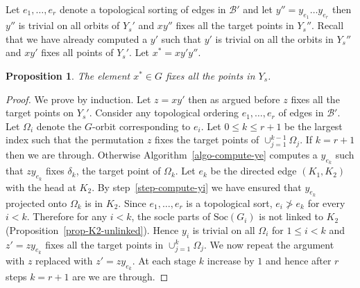 \documentclass[11pt]{madras}%
\newtheorem{proposition}[theorem]{Proposition}
\theoremstyle{remark}
\newcommand{\Soc}[1]{{\ensuremath{\mathrm{Soc}\left(#1\right)}}}
\begin{document}
Let $e_1,\ldots,e_r$ denote a topological sorting of edges in
$\mathcal{B}'$ and let $y'' = y_{e_1}\ldots y_{e_r}$ then $y''$ is
trivial on all orbits of $Y_s'$ and $xy''$ fixes all the target points
in $Y_s''$. Recall that we have already computed a $y'$ such that $y'$
is trivial on all the orbits in $Y_s''$ and $xy'$ fixes all points of
$Y_s'$. Let  $x^* = x y' y''$.

\begin{proposition}
  The element $x^* \in G$ fixes all the points in $Y_s$.
\end{proposition}
\begin{proof}
  We prove by induction. Let $z = xy'$ then as argued before $z$ fixes
  all the target points on $Y_s'$.  Consider any topological ordering
  $e_1,\ldots,e_r$ of edges in $\mathcal{B}'$. Let $\Omega_i$ denote
  the $G$-orbit corresponding to $e_i$. Let $0 \leq k \leq r+1$ be the
  largest index such that the permutation $z$ fixes the target points
  of $\cup_{j = 1}^{k-1} \Omega_j$. If $k=r+1$ then we are through.
  Otherwise Algorithm~\ref{algo-compute-ye} computes a $y_{e_k}$ such
  that $zy_{e_k}$ fixes $\delta_k$, the target point of $\Omega_k$.
  Let $e_k$ be the directed edge $(K_1,K_2)$ with the head at $K_2$.
  By step~\ref{step-compute-yi} we have ensured that $y_{e_k}$
  projected onto $\Omega_k$ is in $K_2$. Since $e_1,\ldots,e_r$ is a
  topological sort, $e_i \ngtr e_k$ for every $i < k$. Therefore for
  any $i < k$, the socle parts of $\Soc{G_i}$ is not linked to $K_2$
  (Proposition~\ref{prop-K2-unlinked}).  Hence $y_i$ is trivial on all
  $\Omega_i$ for $1 \leq i < k$ and $z' = zy_{e_k}$ fixes all the
  target points in $\cup_{j = 1}^{k} \Omega_j$. We now repeat the
  argument with $z$ replaced with $z' = zy_{e_k}$. At each stage $k$
  increase by $1$ and hence after $r$ steps $k = r+1$ are we are
  through.
\end{proof}
\end{document}
